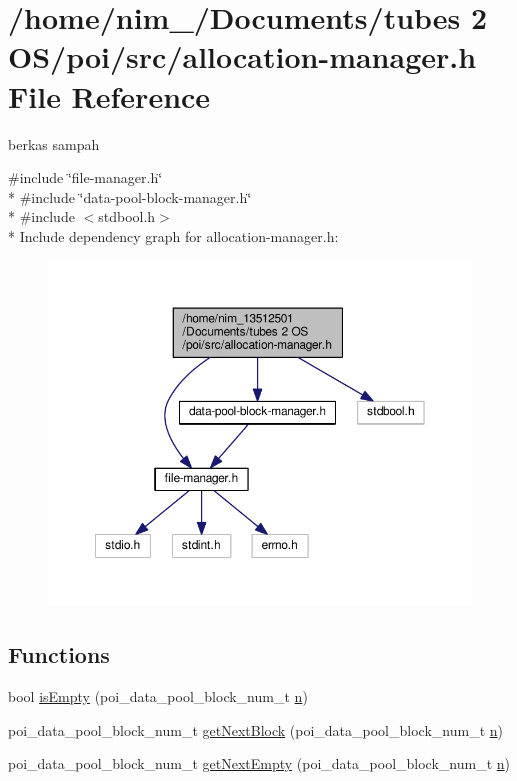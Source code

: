 \hypertarget{allocation-manager_8h}{\section{/home/nim\-\_/\-Documents/tubes 2 O\-S/poi/src/allocation-\/manager.h File Reference}
\label{allocation-manager_8h}
}


berkas sampah  


{\ttfamily \#include \char`\"{}file-\/manager.\-h\char`\"{}}\\*
{\ttfamily \#include \char`\"{}data-\/pool-\/block-\/manager.\-h\char`\"{}}\\*
{\ttfamily \#include $<$stdbool.\-h$>$}\\*
Include dependency graph for allocation-\/manager.h\-:\nopagebreak
\begin{figure}[H]
\begin{center}
\leavevmode
\includegraphics[width=350pt]{allocation-manager_8h__incl}
\end{center}
\end{figure}
\subsection*{Functions}
\begin{DoxyCompactItemize}
\item 
bool \hyperlink{allocation-manager_8h_a56b807a333a2fc6f627265865c1e9f7d}{is\-Empty} (poi\-\_\-data\-\_\-pool\-\_\-block\-\_\-num\-\_\-t \hyperlink{allocation-table-test_8c_a24010dade8ebab3f87a48022772cd975}{n})
\item 
poi\-\_\-data\-\_\-pool\-\_\-block\-\_\-num\-\_\-t \hyperlink{allocation-manager_8h_aac60c48ce4acad3a1d8e459ba5649259}{get\-Next\-Block} (poi\-\_\-data\-\_\-pool\-\_\-block\-\_\-num\-\_\-t \hyperlink{allocation-table-test_8c_a24010dade8ebab3f87a48022772cd975}{n})
\item 
poi\-\_\-data\-\_\-pool\-\_\-block\-\_\-num\-\_\-t \hyperlink{allocation-manager_8h_a98a30f2070bd2d0ace14f19f86484d16}{get\-Next\-Empty} (poi\-\_\-data\-\_\-pool\-\_\-block\-\_\-num\-\_\-t \hyperlink{allocation-table-test_8c_a24010dade8ebab3f87a48022772cd975}{n})
\end{DoxyCompactItemize}
